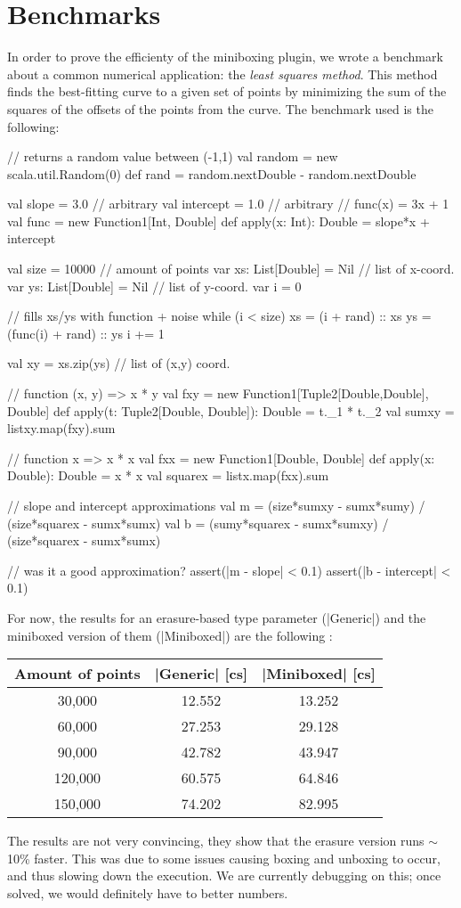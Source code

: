 \section{Benchmarks}

In order to prove the efficienty of the miniboxing plugin, we wrote a benchmark about a common numerical application: the \textit{least squares method}. This method finds the best-fitting curve to a given set of points by minimizing the sum of the squares of the offsets of the points from the curve. The benchmark used is the following:

\begin{lstlisting-nobreak}
 // returns a random value between (-1,1)
 val random = new scala.util.Random(0)
 def rand = random.nextDouble - random.nextDouble
 
 val slope = 3.0  // arbitrary
 val intercept = 1.0  // arbitrary
 // func(x) = 3x + 1
 val func = new Function1[Int, Double] {
   def apply(x: Int): Double =
      slope*x + intercept
 }
 
 val size = 10000 // amount of points
 var xs: List[Double] = Nil // list of x-coord.
 var ys: List[Double] = Nil // list of y-coord.
 var i = 0
 
 // fills xs/ys with function + noise
 while (i < size) {
  xs = (i + rand) :: xs
  ys = (func(i) + rand) :: ys
  i += 1
 }
 
 val xy = xs.zip(ys) // list of (x,y) coord.
 
  // function (x, y) => x * y
 val fxy =
  new Function1[Tuple2[Double,Double], Double] {
     def apply(t: Tuple2[Double, Double]): Double = t._1 * t._2
 }
 val sumxy = listxy.map(fxy).sum
 
 // function x => x * x
 val fxx = new Function1[Double, Double] {
   def apply(x: Double): Double = x * x
 }
 val squarex = listx.map(fxx).sum
 
 // slope and intercept approximations
 val m = (size*sumxy - sumx*sumy) / (size*squarex - sumx*sumx)
 val b = (sumy*squarex - sumx*sumxy) / (size*squarex - sumx*sumx)
 
 // was it a good approximation?
 assert(|m - slope| < 0.1)
 assert(|b - intercept| < 0.1)
\end{lstlisting-nobreak}

For now, the results for an erasure-based type parameter (|Generic|) and the miniboxed version of them (|Miniboxed|) are the following :

\begin{center}
\begin{tabular}{ |c|c|c| } 
 \hline
 Amount of points & |Generic| [cs] & |Miniboxed| [cs] \\ 
 \hline
 30,000 & 12.552 & 13.252 \\
 60,000 & 27.253 & 29.128 \\
 90,000 & 42.782 & 43.947 \\
120,000 & 60.575 & 64.846 \\
 150,000 & 74.202 & 82.995 \\
 \hline
\end{tabular}
\end{center}

The results are not very convincing, they show that the erasure version runs $\sim$10\% faster. This was due to some issues causing boxing and unboxing to occur, and thus slowing down the execution. We are currently debugging on this; once solved, we would definitely have to better numbers.